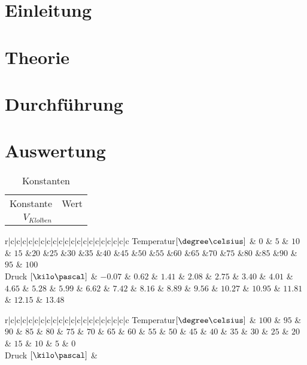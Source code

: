 \documentclass[12pt, a4paper, twoside]{scrartcl}
\begin{document}

\cleardoublepage
\tableofcontents
\cleardoublepage
\setcounter{page}{1}

\section{Einleitung}
\label{sec:einleitung}

\section{Theorie}
\label{sec:theorie}


\section{Durchführung}
\label{sec:durchfuehrung}

\section{Auswertung}
\label{sec:auswertung}


\begin{table}
\centering
\begin{tabular}{r|c}
    Konstante & Wert\\
    $V_{Klolben}$ &  \\
    
 \end{tabular} 
 \caption{\label{tab:}Konstanten}
\end{table}


\begin{table}
\centering
\begin{tabular}{r|c|c|c|c|c|c|c|c|c|c|c|c|c|c|c|c|c|c|c|c}
    Temperatur$[\degree\celsius]$ & $0$ & $5$ & $10$ & $15$ &$20$ &$25$ &$30$ &$35$ &$40$ &$45$ &$50$ &$55$ &$60$ &$65$ &$70$ &$75$ &$80$ &$85$ &$90$ & $95$ & $100$\\
    Druck $[\kilo\pascal]$ &  $-0.07$ & $0.62$ & $ 1.41$ & $2.08$ & $2.75$ & $3.40$ & $4.01$ & $4.65$ & $5.28$ & $5.99$ & $6.62$ & $7.42$ & $8.16$ & $8.89$ & $9.56$ & $10.27$ & $10.95$ & $11.81$ & $12.15$ & $13.48$  \\
    
 \end{tabular} 
 \caption{\label{tab:}Erwärmen}
\end{table}

\begin{table}
\centering
\begin{tabular}{r|c|c|c|c|c|c|c|c|c|c|c|c|c|c|c|c|c|c|c|c}
    Temperatur$[\degree\celsius]$ & $100$ & $95$ & $90$ & $85$ & $80$ & $75$ & $70$ & $65$ & $60$ & $55$ & $50$ & $45$ & $40$ & $35$ & $30$ & $25$ & $20$ & $15$ & $10$ & $5$ & $0$ \\
    Druck $[\kilo\pascal]$ &  \\
    
 \end{tabular} 
 \caption{\label{tab:}Abkühlen}
\end{table}
\end{document}
